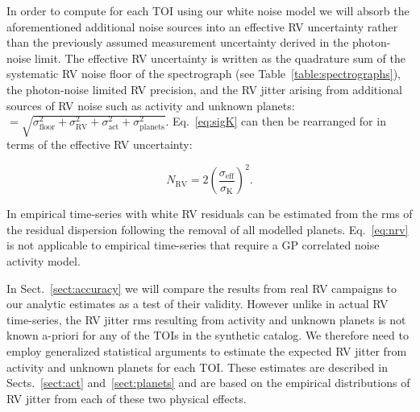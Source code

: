 In order to compute \nrv{} for each TOI using our white noise model we will
absorb the aforementioned additional noise sources into an effective RV uncertainty \sigeff{} rather than the
previously assumed measurement uncertainty derived in the photon-noise limit. The effective RV uncertainty is
written as the quadrature sum of the systematic RV noise floor of the spectrograph \sigfloor{}
(see Table~\ref{table:spectrographs}), the photon-noise limited RV precision, and the RV jitter arising from
additional sources of RV noise such as activity and unknown planets: \sigeff{}
$=\sqrt{\sigma_{\text{floor}}^2+\sigma_{\text{RV}}^2+\sigma_{\text{act}}^2 + \sigma_{\text{planets}}^2}$.
Eq.~\ref{eq:sigK} can then be rearranged for \nrv{} in terms of the effective RV uncertainty:

\begin{equation}
  N_{\text{RV}} = 2 \left( \frac{\sigma_{\text{eff}}}{\sigma_{\text{K}}} \right)^2.
  \label{eq:nrv}
\end{equation}

\noindent In empirical time-series with white RV residuals
\sigeff{} can be estimated from the rms of the residual dispersion following the removal of
all modelled planets.
Eq.~\ref{eq:nrv} is not applicable to 
empirical time-series that require a GP correlated noise activity model.

In Sect.~\ref{sect:accuracy} we will compare the results from real RV campaigns to our 
analytic estimates as a test of their validity. 
However unlike in actual RV time-series, the RV jitter rms
resulting from activity and unknown planets is not known a-priori for any of the TOIs in the
 synthetic catalog. We therefore need to employ generalized statistical arguments
to estimate the expected RV jitter from activity and unknown planets for each TOI. These estimates are
described in Sects.~\ref{sect:act} and~\ref{sect:planets} and are based on the empirical distributions of
RV jitter from each of these two physical effects.

